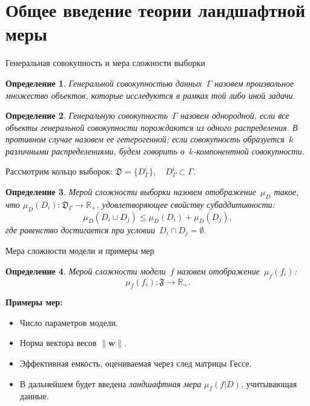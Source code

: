 \documentclass[10pt,pdf,hyperref={unicode}]{beamer}
\newtheorem{rusdefinition}{Определение}
\begin{document}
\section{Общее введение теории ландшафтной меры}
\begin{frame}{Генеральная совокупность и мера сложности выборки}
\justifying

\begin{rusdefinition}
    \justifying
    Генеральной совокупностью данных~$\Gamma$ назовем произвольное множество объектов, которые исследуются в рамках той либо иной задачи.
\end{rusdefinition}

\begin{rusdefinition}
    \justifying
    Генеральную совокупность~$\Gamma$ назовем однородной, если все объекты генеральной совокупности порождаются из одного распределения. В противном случае назовем ее гетерогенной; если совокупность образуется~$k$ различными распределениями, будем говорить о~$k$-компонентной совокупности.
\end{rusdefinition}

\vspace{0.1cm}
Рассмотрим кольцо выборок: $\mathfrak{D} = \{D_\Gamma^i\}, \quad D_\Gamma^i \subset \Gamma.$

\begin{rusdefinition}
    \justifying
    Мерой сложности выборки назовем отображение~$\mu_D$ такое, что $\mu_D(D_i):\mathfrak{D}_\Gamma\to\mathbb{R}_+$, удовлетворяющее свойству субаддитивности:
    \[
        \mu_D(D_i\cup D_j) \leq \mu_D(D_i)+\mu_D(D_j),
    \]
    где равенство достигается при условии~$D_i\cap D_j=\emptyset.$
\end{rusdefinition}
\end{frame}
\begin{frame}{Мера сложности модели и примеры мер}
\justifying

\begin{rusdefinition}
\justifying
    Мерой сложности модели~$f$ назовем отображение~$\mu_f(f_i)$:
    \[
        \mu_f(f_i) : \mathfrak{F} \to \mathbb{R}_+.
    \]
\end{rusdefinition}

\vspace{0.2cm}
\textbf{Примеры мер:}
\begin{itemize}
    \item Число параметров модели.
    \item Норма вектора весов $\|\mathbf{w}\|$.
    \item Эффективная емкость, оцениваемая через след матрицы Гессе.
    \item В дальнейшем будет введена \textit{ландшафтная мера} $\mu_f(f|D)$, учитывающая данные.
\end{itemize}
\end{frame}
\end{document}
